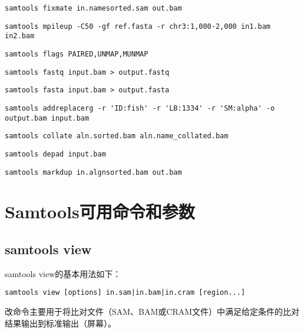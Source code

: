 \begin{lstlisting}[style=mycommandBlockStyle]
samtools fixmate in.namesorted.sam out.bam 
\end{lstlisting}
\begin{lstlisting}[style=mycommandBlockStyle]
samtools mpileup -C50 -gf ref.fasta -r chr3:1,000-2,000 in1.bam in2.bam 
\end{lstlisting}
\begin{lstlisting}[style=mycommandBlockStyle]
samtools flags PAIRED,UNMAP,MUNMAP 
\end{lstlisting}
\begin{lstlisting}[style=mycommandBlockStyle]
samtools fastq input.bam > output.fastq 
\end{lstlisting}
\begin{lstlisting}[style=mycommandBlockStyle]
samtools fasta input.bam > output.fasta 
\end{lstlisting}
\begin{lstlisting}[style=mycommandBlockStyle]
samtools addreplacerg -r 'ID:fish' -r 'LB:1334' -r 'SM:alpha' -o output.bam input.bam 
\end{lstlisting}
\begin{lstlisting}[style=mycommandBlockStyle]
samtools collate aln.sorted.bam aln.name_collated.bam 
\end{lstlisting}
\begin{lstlisting}[style=mycommandBlockStyle]
samtools depad input.bam 
\end{lstlisting}
\begin{lstlisting}[style=mycommandBlockStyle]
samtools markdup in.algnsorted.bam out.bam
\end{lstlisting}

\section{Samtools可用命令和参数}

\subsection{samtools view}

samtools view的基本用法如下：
\begin{lstlisting}[style=mycommandBlockStyle]
samtools view [options] in.sam|in.bam|in.cram [region...] 
\end{lstlisting}

改命令主要用于将比对文件（SAM、BAM或CRAM文件）中满足给定条件的比对结果输出到标准输出（屏幕）。


